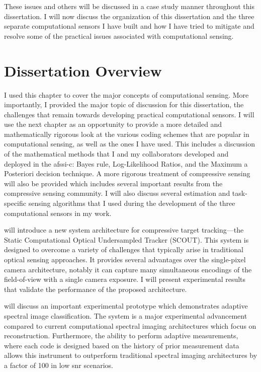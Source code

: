 These issues and others will be discussed in a case study manner throughout this dissertation. I will now discuss the organization of this dissertation and the three separate computational sensors I have built and how I have tried to mitigate and resolve some of the practical issues associated with computational sensing.

\section{Dissertation Overview}

I used this chapter to cover the major concepts of computational sensing. More importantly, I provided the major topic of discussion for this dissertation, the challenges that remain towards developing practical computational sensors. I will use the next chapter as an opportunity to provide a more detailed and mathematically rigorous look at the various coding schemes that are popular in computational sensing, as well as the ones I have used. This includes a discussion of the mathematical methods that I and my collaborators developed and deployed in the \gls{afssi-c}: Bayes rule, Log-Likelihood Ratios, and the Maximum a Posteriori decision technique. A more rigorous treatment of compressive sensing will also be provided which includes several important results from the compressive sensing community. I will also discuss several estimation and task-specific sensing algorithms that I used during the development of the three computational sensors in my work.

 will introduce a new system architecture for compressive target tracking---the Static Computational Optical Undersampled Tracker (SCOUT). This system is designed to overcome a variety of challenges that typically arise in traditional optical sensing approaches. It provides several advantages over the single-pixel camera architecture, notably it can capture many simultaneous encodings of the field-of-view with a single camera exposure. I will present experimental results that validate the performance of the proposed architecture. 

 will discuss an important experimental prototype which demonstrates adaptive spectral image classification. The system is a major experimental advancement compared to current computational spectral imaging architectures which focus on reconstruction. Furthermore, the ability to perform adaptive measurements, where each code is designed based on the history of prior measurement data allows this instrument to outperform traditional spectral imaging architectures by a factor of 100 in low \gls{snr} scenarios.

